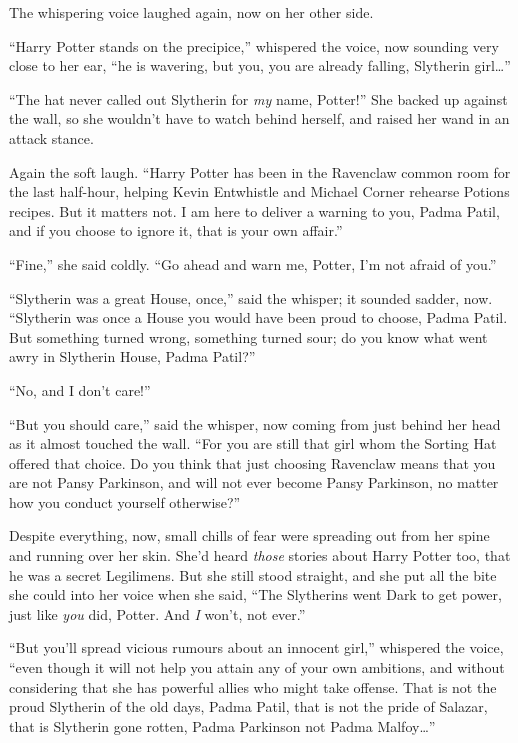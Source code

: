 The whispering voice laughed again, now on her other side.

“Harry Potter stands on the precipice,” whispered the voice, now sounding very close to her ear, “he is wavering, but you, you are already falling, Slytherin girl…”

“The hat never called out Slytherin for \emph{my} name, Potter!” She backed up against the wall, so she wouldn’t have to watch behind herself, and raised her wand in an attack stance.

Again the soft laugh. “Harry Potter has been in the Ravenclaw common room for the last half-hour, helping Kevin Entwhistle and Michael Corner rehearse Potions recipes. But it matters not. I am here to deliver a warning to you, Padma Patil, and if you choose to ignore it, that is your own affair.”

“Fine,” she said coldly. “Go ahead and warn me, Potter, I’m not afraid of you.”

“Slytherin was a great House, once,” said the whisper; it sounded sadder, now. “Slytherin was once a House you would have been proud to choose, Padma Patil. But something turned wrong, something turned sour; do you know what went awry in Slytherin House, Padma Patil?”

“No, and I don’t care!”

“But you should care,” said the whisper, now coming from
just behind her head as it almost touched the wall. “For you
are still that girl whom the Sorting Hat offered that choice. Do you think that just choosing Ravenclaw means that you are not Pansy Parkinson, and will not ever become Pansy Parkinson, no matter how you conduct yourself otherwise?”

Despite everything, now, small chills of fear were spreading out from her spine and running over her skin. She’d heard \emph{those} stories about Harry Potter too, that he was a secret Legilimens. But she still stood straight, and she put all the bite she could into her voice when she said, “The Slytherins went Dark to get power, just like \emph{you} did, Potter. And \emph{I} won’t, not ever.”

“But you’ll spread vicious rumours about an innocent girl,” whispered the voice, “even though it will not help you attain any of your own ambitions, and without considering that she has powerful allies who might take offense. That is not the proud Slytherin of the old days, Padma Patil, that is not the pride of Salazar, that is Slytherin gone rotten, Padma Parkinson not Padma Malfoy…”

